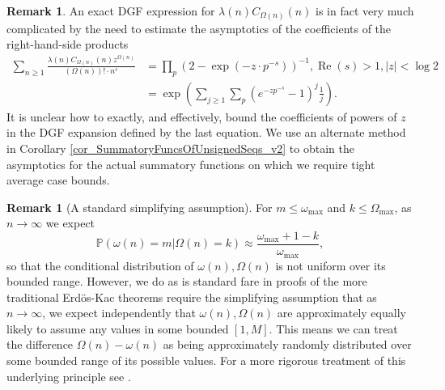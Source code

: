 \documentclass[11pt,reqno,a4letter]{article}
\numberwithin{figure}{section}
\numberwithin{table}{section}
\theoremstyle{plain}
\numberwithin{theorem}{section}
\theoremstyle{definition}
\newtheorem{remark}[theorem]{Remark}
\renewcommand{\Re}{\operatorname{Re}}
\begin{document}
\begin{remark}
An exact DGF expression for 
$\lambda(n) C_{\Omega(n)}(n)$ is in fact very much complicated by the need to estimate the asymptotics 
of the coefficients of the right-hand-side products 
\begin{align*} 
\sum_{n \geq 1} \frac{\lambda(n) C_{\Omega(n)}(n) z^{\Omega(n)}}{(\Omega(n))! \cdot n^s} & = 
     \prod_p \left(2 - \exp\left(-z \cdot p^{-s}\right)\right)^{-1}, 
     \Re(s) > 1, |z| < \log 2 \\ 
     & = \exp\left(\sum_{j \geq 1} \sum_p \left(e^{-zp^{-s}}-1\right)^{j} \frac{1}{j}\right). 
\end{align*} 
It is unclear how to exactly, and effectively, bound the 
coefficients of powers of $z$ in the DGF expansion defined by the last equation. 
We use an alternate method in 
Corollary \ref{cor_SummatoryFuncsOfUnsignedSeqs_v2} 
to obtain the asymptotics for the actual 
summatory functions on which we require tight average case bounds. 
\end{remark} 

\begin{remark}[A standard simplifying assumption] 
For $m \leq \omega_{\max}$ and $k \leq \Omega_{\max}$, as $n \rightarrow \infty$ 
we expect 
\[
\mathbb{P}\left(\omega(n) = m | \Omega(n) = k\right) \approx 
     \frac{\omega_{\max} + 1 - k}{\omega_{\max}}, 
\]
so that the conditional distribution of $\omega(n),\Omega(n)$ is not uniform over its 
bounded range. However, we do as is standard fare in proofs of the more traditional 
Erd\"os-Kac theorems require the simplifying assumption that as $n \rightarrow \infty$, 
we expect independently that $\omega(n),\Omega(n)$ are approximately equally likely to 
assume any values in some bounded $[1, M]$. This means we can treat the difference 
$\Omega(n) - \omega(n)$ as being approximately randomly distributed over some bounded range 
of its possible values. 
For a more rigorous treatment of this underlying principle see 
\cite{ERDOS-KAC-REF,BILLINGSLY-CLT-PRIMEDIVFUNC,RENYI-TURAN}. 
\end{remark} 
\end{document}
